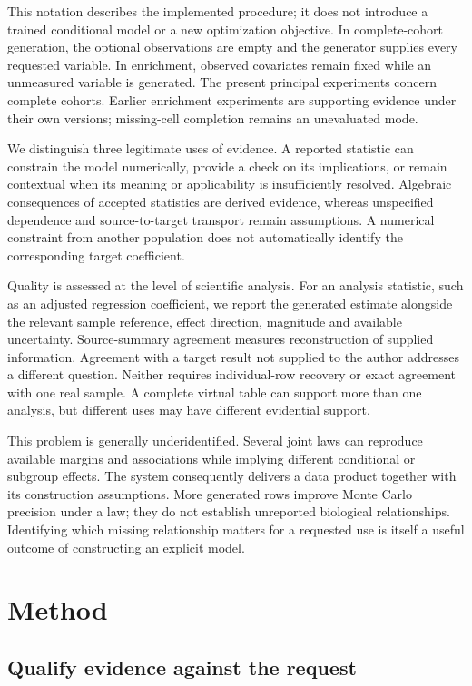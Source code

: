 \documentclass[10pt,twocolumn]{article}
\begin{document}
This notation describes the implemented procedure; it does not introduce a trained conditional model or a new optimization objective. In complete-cohort generation, the optional observations are empty and the generator supplies every requested variable. In enrichment, observed covariates remain fixed while an unmeasured variable is generated. The present principal experiments concern complete cohorts. Earlier enrichment experiments are supporting evidence under their own versions; missing-cell completion remains an unevaluated mode.


We distinguish three legitimate uses of evidence. A reported statistic can constrain the model numerically, provide a check on its implications, or remain contextual when its meaning or applicability is insufficiently resolved. Algebraic consequences of accepted statistics are derived evidence, whereas unspecified dependence and source-to-target transport remain assumptions. A numerical constraint from another population does not automatically identify the corresponding target coefficient.


Quality is assessed at the level of scientific analysis. For an analysis statistic, such as an adjusted regression coefficient, we report the generated estimate alongside the relevant sample reference, effect direction, magnitude and available uncertainty. Source-summary agreement measures reconstruction of supplied information. Agreement with a target result not supplied to the author addresses a different question. Neither requires individual-row recovery or exact agreement with one real sample. A complete virtual table can support more than one analysis, but different uses may have different evidential support.


This problem is generally underidentified. Several joint laws can reproduce available margins and associations while implying different conditional or subgroup effects. The system consequently delivers a data product together with its construction assumptions. More generated rows improve Monte Carlo precision under a law; they do not establish unreported biological relationships. Identifying which missing relationship matters for a requested use is itself a useful outcome of constructing an explicit model.


\section{Method}

\subsection{Qualify evidence against the request}
\end{document}

